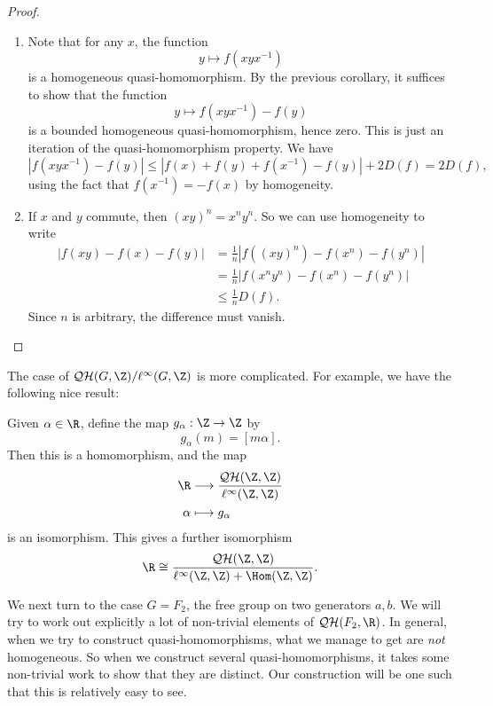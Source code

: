 \documentclass[a4paper]{article}
\newcommand\QH{\mathcal{QH}}
\newcommand\Free{F}
\begin{document}
\begin{proof}\leavevmode
  \begin{enumerate}
    \item Note that for any $x$, the function
      \[
        y \mapsto f(xyx^{-1})
      \]
      is a homogeneous quasi-homomorphism. By the previous corollary, it suffices to show that the function
      \[
        y \mapsto f(xyx^{-1}) - f(y)
      \]
      is a bounded homogeneous quasi-homomorphism, hence zero. This is just an iteration of the quasi-homomorphism property. We have
      \[
        |f(xyx^{-1}) - f(y)| \leq |f(x) + f(y) + f(x^{-1}) - f(y)| + 2D(f) = 2D(f),
      \]
      using the fact that $f(x^{-1}) = -f(x)$ by homogeneity.
    \item If $x$ and $y$ commute, then $(xy)^n = x^n y^n$. So we can use homogeneity to write
      \begin{align*}
        |f(xy) - f(x) - f(y)| &= \frac{1}{n} |f((xy)^n) - f(x^n) - f(y^n)|\\
        &= \frac{1}{n} | f(x^n y^n) - f(x^n) - f(y^n)|\\
        &\leq \frac{1}{n} D(f).
      \end{align*}
      Since $n$ is arbitrary, the difference must vanish.
  \end{enumerate}
\end{proof}

The case of $\QH(G, \Z)/\ell^\infty(G, \Z)$ is more complicated. For example, we have the following nice result:
\begin{eg}
  Given $\alpha \in \R$, define the map $g_\alpha: \Z \to \Z$ by
  \[
    g_\alpha(m) = [m\alpha].
  \]
  Then this is a homomorphism, and the map
  \begin{align*}
    \R &\longrightarrow \frac{\QH(\Z, \Z)}{\ell^\infty(\Z, \Z)}\\
    \alpha &\longmapsto g_\alpha
  \end{align*}
  is an isomorphism. This gives a further isomorphism
  \[
    \R \cong \frac{\QH(\Z, \Z)}{\ell^\infty(\Z, \Z) + \Hom(\Z, \Z)}.
  \]
\end{eg}

We next turn to the case $G = \Free_2$, the free group on two generators $a, b$. We will try to work out explicitly a lot of non-trivial elements of $\QH(\Free_2, \R)$. In general, when we try to construct quasi-homomorphisms, what we manage to get are \emph{not} homogeneous. So when we construct several quasi-homomorphisms, it takes some non-trivial work to show that they are distinct. Our construction will be one such that this is relatively easy to see.
\end{document}
